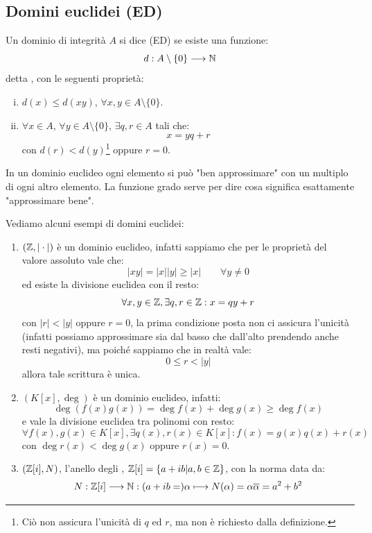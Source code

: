\documentclass[11pt]{scrartcl}
\begin{document}
\subsection{Domini euclidei (ED)}
\begin{definition}
    Un dominio di integrità $A$ si dice  (ED) se esiste una funzione:
    \[ d : A \setminus\{0\} \longrightarrow \mathbb N
        \]
    detta , con le seguenti proprietà:
    \begin{enumerate}[(i)]
        \item $d(x) \leq d(xy)$, $\forall x,y \in A \setminus\{0\}$.
        \item $\forall x \in A$, $\forall y \in A \setminus\{0\}$, $\exists q,r \in A$ tali che:
        \[ x = yq+r
            \]
        con $d(r) < d(y)$\footnote{Ciò non assicura l'unicità di $q$ ed $r$, ma non è richiesto dalla definizione.} oppure $r = 0$.
    \end{enumerate}
\end{definition}

\begin{remark}
    In un dominio euclideo ogni elemento si può "ben approssimare" con un multiplo di ogni altro elemento. La funzione
    grado serve per dire cosa significa esattamente "approssimare bene".
\end{remark}

\begin{example}
    Vediamo alcuni esempi di domini euclidei:
    \begin{enumerate}[(1)]
        \item $(\mathbb Z, |\cdot|)$ è un dominio euclideo, infatti sappiamo che per le proprietà del valore assoluto vale che:
        \[ |xy| = |x||y| \geq |x| \qquad \forall y \ne 0
            \]
        ed esiste la divisione euclidea con il resto:
        \[ \forall x,y \in \mathbb Z, \exists q,r \in \mathbb Z: x = qy + r
            \]
        con $|r| < |y|$ oppure $r = 0$, la prima condizione posta non ci assicura l'unicità (infatti possiamo approssimare sia dal basso che dall'alto 
        prendendo anche resti negativi), ma poiché sappiamo che in realtà vale:
        \[ 0 \leq r < |y|
            \]
        allora tale scrittura è unica.
        \item $(K[x],\deg)$ è un dominio euclideo, infatti:
        \[ \deg (f(x)g(x)) = \deg f(x) + \deg g(x) \geq \deg f(x)
            \]
        e vale la divisione euclidea tra polinomi con resto:
        \[ \forall f(x),g(x) \in K[x], \exists q(x),r(x)\in K[x] : f(x) = g(x)q(x) + r(x)
            \]
        con $\deg r(x) < \deg g(x)$ oppure $ r(x) = 0$.
        \item $(\mathbb Z[i],N)$, l'anello degli , $\mathbb Z[i] = \{a + ib | a,b \in \mathbb Z\}$, con la norma data da:
            \[ N : \mathbb Z[i] \longrightarrow \mathbb N : (a +ib =)\alpha \longmapsto N(\alpha) = \alpha \overline{\alpha} = a^2+b^2
                \]
    \end{enumerate}
\end{example}
\end{document}
